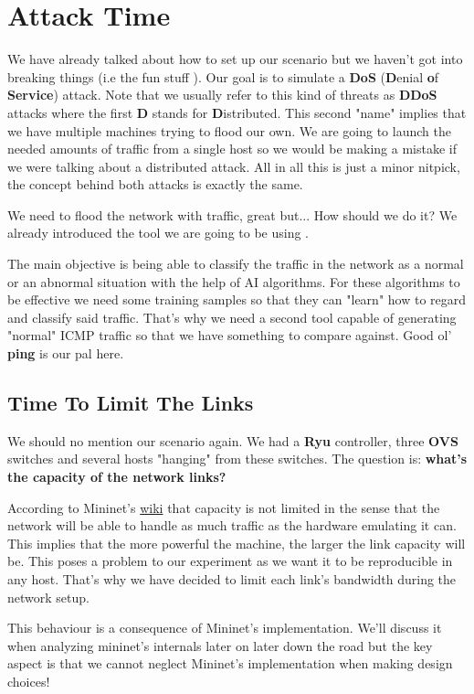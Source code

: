 \documentclass[12pt]{article}
\newcommand{\newpar} {
    \vskip 1cm
}
\begin{document}
\newpage
\section{Attack Time}
	We have already talked about how to set up our scenario but we haven't got into breaking things (i.e the fun stuff  ). Our goal is to simulate a \textbf{DoS} (\textbf{D}enial \textbf{o}f \textbf{Service}) attack. Note that we usually refer to this kind of threats as \textbf{DDoS} attacks where the first \textbf{D} stands for \textbf{D}istributed. This second "name" implies that we have multiple machines trying to flood our own. We are going to launch the needed amounts of traffic from a single host so we would be making a mistake if we were talking about a distributed attack. All in all this is just a minor nitpick, the concept behind both attacks is exactly the same.
	\newpar
	We need to flood the network with traffic, great but... How should we do it? We already introduced the tool we are going to be using .
	\newpar
	The main objective is being able to classify the traffic in the network as a normal or an abnormal situation with the help of AI algorithms. For these algorithms to be effective we need some training samples so that they can "learn" how to regard and classify said traffic. That's why we need a second tool capable of generating "normal" ICMP traffic so that we have something to compare against. Good ol' \textbf{ping} is our pal here.

	\subsection{Time To Limit The Links}
		We should no mention our scenario again. We had a \textbf{Ryu} controller, three \textbf{OVS} switches and several hosts "hanging" from these switches. The question is: \textbf{what's the capacity of the network links?}
		\newpar
		According to Mininet's \href{https://github.com/mininet/mininet/wiki/Introduction-to-Mininet}{wiki} that capacity is not limited in the sense that the network will be able to handle as much traffic as the hardware emulating it can. This implies that the more powerful the machine, the larger the link capacity will be. This poses a problem to our experiment as we want it to be reproducible in any host. That's why we have decided to limit each link's bandwidth during the network setup.
		\newpar
		This behaviour is a consequence of Mininet's implementation. We'll discuss it when analyzing mininet's internals later on later down the road but the key aspect is that we cannot neglect Mininet's implementation when making design choices!
\end{document}
